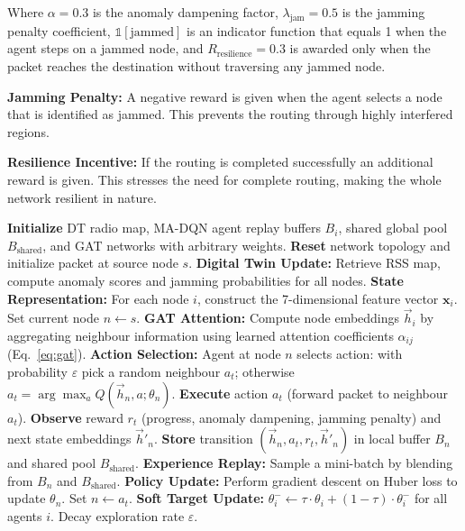 \documentclass[conference]{IEEEtran}
\begin{document}
\noindent Where $\alpha = 0.3$ is the anomaly dampening factor, $\lambda_{\text{jam}} = 0.5$ is the jamming penalty coefficient, $\mathbb{1}[\text{jammed}]$ is an indicator function that equals 1 when the agent steps on a jammed node, and $R_{\text{resilience}} = 0.3$ is awarded only when the packet reaches the destination without traversing any jammed node.

\textbf{Jamming Penalty:} A negative reward is given when the agent selects a node that is identified as jammed. This prevents the routing through highly interfered regions.

\textbf{Resilience Incentive:} If the routing is completed successfully an additional reward is given. This stresses the need for complete routing, making the whole network resilient in nature.
\begin{algorithm}[htbp]
\caption{Resilient Routing with MA GAT+DT}
\label{alg:madtgcn}
\begin{algorithmic}[1]
\STATE \textbf{Initialize} DT radio map, MA-DQN agent replay buffers $B_i$, shared global pool $B_{\text{shared}}$, and GAT networks with arbitrary weights.
    \STATE \textbf{Reset} network topology and initialize packet at source node $s$.
    \STATE \textbf{Digital Twin Update:} Retrieve RSS map, compute anomaly scores and jamming probabilities for all nodes.
    \STATE \textbf{State Representation:} For each node $i$, construct the 7-dimensional feature vector $\mathbf{x}_i$.
    \STATE Set current node $n \leftarrow s$.
        \STATE \textbf{GAT Attention:} Compute node embeddings $\vec{h}_i$ by aggregating neighbour information using learned attention coefficients $\alpha_{ij}$ (Eq.~\ref{eq:gat}).
        \STATE \textbf{Action Selection:} Agent at node $n$ selects action: with probability $\varepsilon$ pick a random neighbour $a_t$; otherwise $a_t = \arg\max_{a} Q(\vec{h}_n, a; \theta_n)$.
        \STATE \textbf{Execute} action $a_t$ (forward packet to neighbour $a_t$).
        \STATE \textbf{Observe} reward $r_t$ (progress, anomaly dampening, jamming penalty) and next state embeddings $\vec{h}'_n$.
        \STATE \textbf{Store} transition $(\vec{h}_n, a_t, r_t, \vec{h}'_n)$ in local buffer $B_n$ and shared pool $B_{\text{shared}}$.
        \STATE \textbf{Experience Replay:} Sample a mini-batch by blending from $B_n$ and $B_{\text{shared}}$.
        \STATE \textbf{Policy Update:} Perform gradient descent on Huber loss to update $\theta_n$.
        \STATE Set $n \leftarrow a_t$.
    \ENDWHILE
        \STATE \textbf{Soft Target Update:} $\theta_i^{-} \leftarrow \tau \cdot \theta_i + (1 - \tau) \cdot \theta_i^{-}$ for all agents $i$.
    \ENDIF
    \STATE Decay exploration rate $\varepsilon$.
\ENDFOR
\end{algorithmic}
\end{algorithm}
\end{document}
